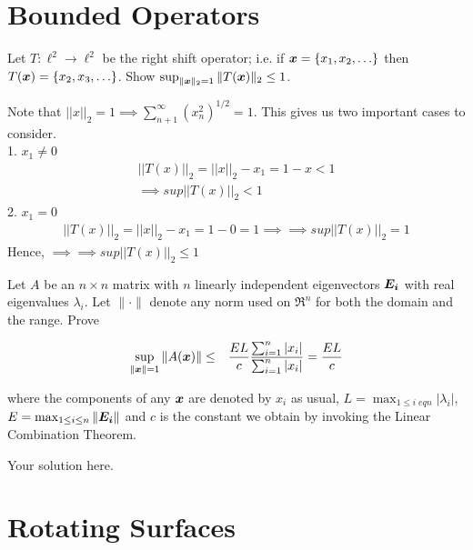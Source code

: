 \documentclass[11pt]{SelfArxOneColBMN}
\begin{document}
\section{Bounded Operators}

\begin{exercise}
Let $T : \ell^2 \rightarrow \ell^2$ be the right shift operator; i.e. if $\boldsymbol{x} = \{x_1, x_2, \ldots \}$
then $T(\boldsymbol{x}) = \{x_2, x_3, \ldots \}$.  Show $\sup_{\|\boldsymbol{x}\|_2 = 1} \|T(\boldsymbol{x})\|_2 \leq 1$.
\end{exercise}

\begin{solution}
  Note that $||x||_2 = 1 \implies \sum_{n+1}^\infty(x_n^2)^{1/2} = 1$. This gives us two important cases to consider.\\
  1. $x_1 \neq 0$\\
  \begin{eqnarray*}
    ||T(x)||_2 = ||x||_2 - x_1 = 1 - x < 1\\
    \implies sup||T(x)||_2 < 1
  \end{eqnarray*} 
  2. $x_1 = 0$
  \begin{eqnarray*}
    ||T(x)||_2 = ||x||_2 - x_1 = 1 - 0 = 1
    \implies \implies sup||T(x)||_2 = 1
  \end{eqnarray*}
  Hence, $\implies \implies sup||T(x)||_2 \leq 1$
\end{solution}

\begin{exercise}
Let $A$ be an $n \times n$ matrix with $n$ linearly independent
eigenvectors $\boldsymbol{E_i}$ with real eigenvalues $\lambda_i$.  Let
$\| \cdot \|$ denote any norm used on $\Re^n$ for both the domain and
the range. Prove

\begin{eqnarray*} \sup_{\|\boldsymbol{x}\| = 1} \|A(\boldsymbol{x})\|
&\leq& \frac{EL}{c} \frac{\sum_{i=1}^n |x_i|}{\sum_{i=1}^n |x_i|} =
\frac{EL}{c}
\end{eqnarray*}

\noindent
where the components of any $\boldsymbol{x}$ are denoted by $x_i$ as usual, $L
= \max_{1 \leq i \;eq n} |\lambda_i|$, $E = \max_{1 \leq i \leq n}
\|\boldsymbol{E_i}\|$ and $c$ is the constant we obtain by invoking the Linear
Combination Theorem.
\end{exercise}

\begin{solution}
Your solution here.
\end{solution}

\section{Rotating Surfaces}
\end{document}
